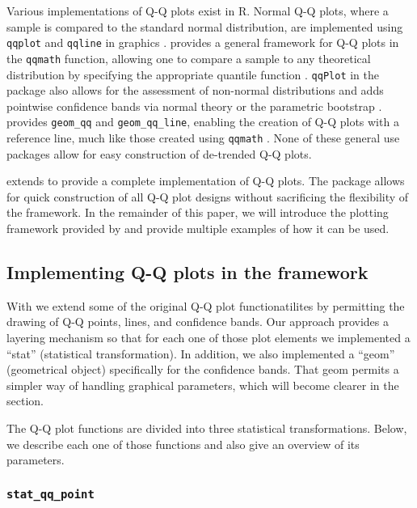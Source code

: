 Various implementations of Q-Q plots exist in R. Normal Q-Q plots, where
a sample is compared to the standard normal distribution, are
implemented using \texttt{qqplot} and \texttt{qqline} in 
graphics \citep{R}.  provides a general framework for Q-Q
plots in the \texttt{qqmath} function, allowing one to compare a sample
to any theoretical distribution by specifying the appropriate quantile
function \citep{lattice}. \texttt{qqPlot} in the  package also
allows for the assessment of non-normal distributions and adds pointwise
confidence bands via normal theory or the parametric bootstrap
\citep{car}.  provides \texttt{geom\_qq} and
\texttt{geom\_qq\_line}, enabling the creation of Q-Q plots with a
reference line, much like those created using \texttt{qqmath}
\citep{ggplot2}. None of these general use packages allow for easy
construction of de-trended Q-Q plots.

 extends  to provide a complete implementation
of Q-Q plots. The package allows for quick construction of all Q-Q plot
designs without sacrificing the flexibility of the 
framework. In the remainder of this paper, we will introduce the
plotting framework provided by  and provide multiple
examples of how it can be used.

\subsection{\texorpdfstring{Implementing Q-Q plots in the 
framework}{Implementing Q-Q plots in the  framework}}\label{implementing-q-q-plots-in-the-framework}

With  we extend some of the original  Q-Q plot
functionatilites by permitting the drawing of Q-Q points, lines, and
confidence bands. Our approach provides a  layering
mechanism so that for each one of those plot elements we implemented a
 ``stat'' (statistical transformation). In addition, we
also implemented a  ``geom'' (geometrical object)
specifically for the confidence bands. That geom permits a simpler way
of handling graphical parameters, which will become clearer in the
 section.

The Q-Q plot functions are divided into three statistical
transformations. Below, we describe each one of those functions and also
give an overview of its parameters.

\subsubsection{\texorpdfstring{\texttt{stat\_qq\_point}}{stat\_qq\_point}}\label{stat_qq_point}

